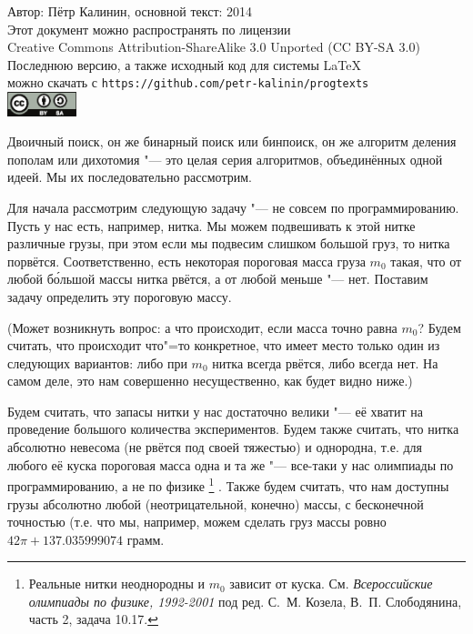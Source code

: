 \documentclass[a4paper,10pt]{problems}
\begin{document}
\begin{flushright}
Автор: Пётр Калинин, основной текст: 2014\\
Этот документ можно распространять по лицензии\\
Creative Commons Attribution-ShareAlike 3.0 Unported (CC BY-SA 3.0)\\
Последнюю версию, а также исходный код для системы \LaTeX\\
можно скачать с \verb`https://github.com/petr-kalinin/progtexts`\\
\includegraphics[width=2cm]{by-sa-corr.eps}
\end{flushright}


Двоичный поиск, он же бинарный поиск или бинпоиск, он же алгоритм деления пополам или дихотомия "--- это целая серия алгоритмов, объединённых одной идеей. 
Мы их последовательно рассмотрим.


Для начала рассмотрим следующую задачу "--- не совсем по программированию. Пусть у нас есть, например, нитка. 
Мы можем подвешивать к этой нитке различные грузы, при этом если мы подвесим слишком большой груз, то нитка порвётся. 
Соответственно, есть некоторая пороговая масса груза $m_0$ такая, что от любой б\'{о}льшой массы нитка рвётся, а от любой меньше "--- нет.
Поставим задачу определить эту пороговую массу.

(Может возникнуть вопрос: а что происходит, если масса точно равна $m_0$? 
Будем считать, что происходит что"=то конкретное, что имеет место только один из следующих вариантов: либо при $m_0$ нитка всегда рвётся, либо всегда нет.
На самом деле, это нам совершенно несущественно, как будет видно ниже.)

Будем считать, что запасы нитки у нас достаточно велики "--- её хватит на проведение большого количества экспериментов.
Будем также считать, что нитка абсолютно невесома (не рвётся под своей тяжестью) и однородна, 
т.е. для любого её куска пороговая масса одна и та же "--- все-таки у нас олимпиады по программированию, а не по физике%
\footnote{Реальные нитки неоднородны и $m_0$ зависит от куска. 
См. \textit{Всероссийские олимпиады по физике, 1992-2001} под ред. С.~М. Козела, В.~П. Слободянина, часть 2, задача 10.17.}%
.
Также будем считать, что нам доступны грузы абсолютно любой (неотрицательной, конечно) массы, с бесконечной точностью 
(т.е. что мы, например, можем сделать груз массы ровно $42\pi+137.035999074$ грамм.
\end{document}
